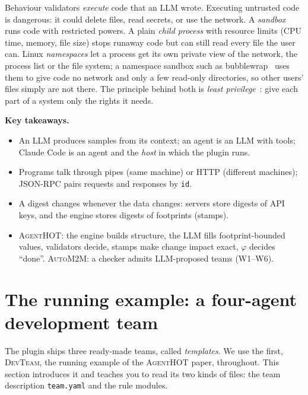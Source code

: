 \documentclass[10pt,a4paper]{article}
\newcommand{\tool}{\textsc{AgentHOT}}
\newcommand{\auto}{\textsc{AutoM2M}}
\newcommand{\cc}{Claude Code}
\newcommand{\W}[1]{\textsf{W#1}}
\newcommand{\devteam}{\textsc{DevTeam}}
\newcommand{\code}[1]{\texttt{#1}}
\newcommand{\file}[1]{\texttt{#1}}
\newenvironment{takeaway}{%
  \begin{tcolorbox}[enhanced, breakable, colback=keybg, colframe=keybg, arc=0pt, boxrule=0pt,
     borderline west={2.2pt}{0pt}{keybar}, left=8pt, right=8pt, top=5pt, bottom=5pt,
     before skip=8pt, after skip=8pt]
  \textsf{\bfseries\color{keybar}Key takeaways.}\par\smallskip}{\end{tcolorbox}}
\begin{document}
Behaviour validators \emph{execute} code that an LLM wrote. Executing
untrusted code is dangerous: it could delete files, read secrets, or use the
network. A \emph{sandbox} runs code with restricted powers. A plain
\emph{child process} with resource limits (CPU time, memory, file size)
stops runaway code but can still read every file the user can. Linux
\emph{namespaces} let a process get its own private view of the network, the
process list or the file system; a namespace sandbox such as
bubblewrap~\cite{bubblewrap} uses them to give code no network and only a
few read-only directories, so other users' files simply are not there. The
principle behind both is \emph{least privilege}~\cite{saltzer1975protection}:
give each part of a system only the rights it needs.

\begin{takeaway}
\begin{itemize}
\item An LLM produces samples from its context; an agent is an LLM with
tools; \cc{} is an agent and the \emph{host} in which the plugin runs.
\item Programs talk through pipes (same machine) or HTTP (different
machines); JSON-RPC pairs requests and responses by \code{id}.
\item A digest changes whenever the data changes: servers store digests of
API keys, and the engine stores digests of footprints (stamps).
\item \tool{}: the engine builds structure, the LLM fills footprint-bounded
values, validators decide, stamps make change impact exact, $\varphi$
decides ``done''. \auto{}: a checker admits LLM-proposed teams
(\W{1}--\W{6}).
\end{itemize}
\end{takeaway}

\section{The running example: a four-agent development team}\label{sec:devteam}

The plugin ships three ready-made teams, called \emph{templates}. We use the
first, \devteam{}, the running example of the \tool{} paper, throughout. This
section introduces it and teaches you to read its two kinds of files: the
team description \file{team.yaml} and the rule modules.
\end{document}
